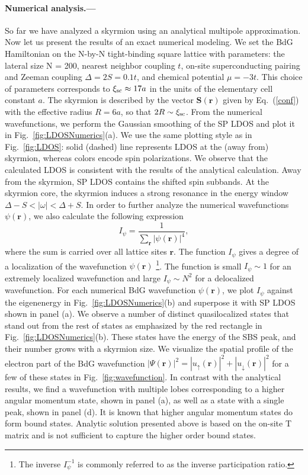 \documentclass[twocolumn,showpacs,floatfix,longbibliography]{revtex4-1}
\begin{document}
\paragraph*{Numerical analysis.---} \label{sec:numerics}
So far we have analyzed a skyrmion using an analytical multipole approximation. Now let us present the results of an exact numerical modeling. We set the BdG Hamiltonian on the N-by-N tight-binding square lattice with parameters: the lateral size N = 200, nearest neighbor coupling $t$, on-site superconducting pairing and Zeeman coupling $\Delta=2S=0.1t$, and chemical potential $\mu = -3t$. This choice of parameters corresponds to $\xi_{\rm sc}\approx 17 a$ in the units of the elementary cell constant $a$. The skyrmion is described by the vector $\bm S(\bm r)$ given by Eq.~(\ref{conf}) with the effective radius $R = 6a$, so that $2R\sim \xi_{\rm sc}$. From the numerical wavefunctions, we perform the Gaussian smoothing of the SP LDOS and plot it in Fig.~\ref{fig:LDOSNumerics}(a). We use the same plotting style as in Fig.~\ref{fig:LDOS}: solid (dashed) line represents LDOS at the (away from) skyrmion, whereas colors encode spin polarizations. We observe that the calculated LDOS is consistent with the results of the analytical calculation. Away from the skyrmion, SP LDOS contains the shifted spin subbands. At the skyrmion core, the skyrmion induces a strong resonance in the energy window $\Delta-S<|\omega|<\Delta+S$. In order to further analyze the numerical wavefunctions $\psi(\bm r)$, we also calculate the following expression
\begin{equation}
	I_\psi =\frac{1}{\sum_{\bm r} |\psi(\bm r)|^4},
	\label{I}
\end{equation}
where the sum is carried over all lattice sites $\bm r$. The function $I_\psi$ gives a degree of a localization of the wavefunction $\psi(\bm r)$ \footnote{The inverse $I_\psi^{-1}$ is commonly referred to as the inverse participation ratio.}. The function is small $I_\psi \sim 1$ for an extremely localized wavefunction and large $I_\psi \sim N^2$ for a delocalized wavefunction. For each numerical BdG wavefunction $\psi(\bm r)$, we plot $I_\psi$ against the eigenenergy in Fig.~\ref{fig:LDOSNumerics}(b) and superpose it with SP LDOS shown in panel (a). We observe a number of distinct quasilocalized states that stand out from the rest of states as emphasized by the red rectangle in Fig.~\ref{fig:LDOSNumerics}(b). These states have the energy of the SBS peak, and their number grows with a skyrmion size. We visualize the spatial profile of the electron part of the BdG wavefunction $|\Psi(\bm r)|^2 = |u_{\uparrow}(\bm r)|^2+|u_{\downarrow}(\bm r)|^2$  for a few of these states in Fig.~\ref{fig:wavefunction}. In contrast with the analytical results, we find a wavefunction with multiple lobes corresponding to a higher angular momentum state, shown in panel (a), as well as a state with a single peak, shown in panel (d). It is known that higher angular momentum states do form bound states. Analytic solution presented above is based on the on-site T matrix and is not sufficient to capture the higher order bound states. 
\end{document}
